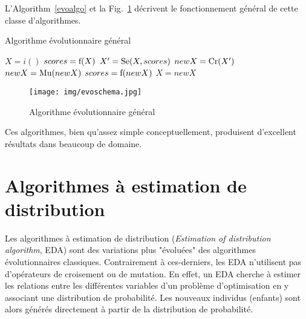 \documentclass[a4paper, 11pt]{report}
\begin{document}
L'Algorithm~\ref{evoalgo} et la Fig.~\ref{evoschema} décrivent le fonctionnement général de cette classe d'algorithmes.

\begin{algorithm}                      
\caption{Algorithme évolutionnaire général~\cite{WIKI_EVO}}          
\label{evoalgo}                           
\begin{algorithmic}                    
\STATE $X = i()$ 
\STATE $scores = \textnormal{f}(X)$ 
\STATE $X' = \textnormal{Se}(X, scores)$ 
\STATE $newX = \textnormal{Cr}(X')$  
\STATE $newX = \textnormal{Mu}(newX)$ 
\STATE $scores = \textnormal{f}(newX)$ 
\STATE $X = newX$ 
\ENDWHILE
\end{algorithmic}
\end{algorithm}

\begin{figure}[!h]
\centering
\texttt{[image: img/evoschema.jpg]}	
\caption{Algorithme évolutionnaire général~\cite{WIKI_EVO}}
\label{evoschema}
\end{figure}

Ces algorithmes, bien qu'assez simple conceptuellement, produisent d'excellent résultats dans beaucoup de domaine.

\section{Algorithmes à estimation de distribution}
\label{edageneral}
Les algorithmes à estimation de distribution (\textit{Estimation of distribution algorithm}, EDA) sont des variations plus "évoluées" des algorithmes évolutionnaires classiques. Contrairement à ces-derniers, les EDA n'utilisent pas d'opérateurs de croisement ou de mutation. En effet, un EDA cherche à estimer les relations entre les différentes variables d'un problème d'optimisation en y associant une distribution de probabilité. Les nouveaux individus (enfants) sont alors générés directement à partir de la distribution de probabilité.
\end{document}
